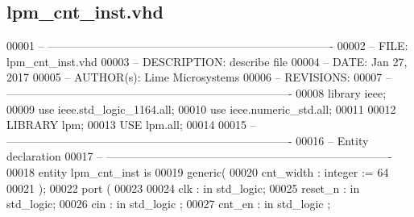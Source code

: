 \subsection{lpm\+\_\+cnt\+\_\+inst.\+vhd}
\label{src_2altera__inst_2lpm__cnt__inst_8vhd_source}

\begin{DoxyCode}
00001 \textcolor{keyword}{-- ---------------------------------------------------------------------------- }
00002 \textcolor{keyword}{-- FILE:    lpm\_cnt\_inst.vhd}
00003 \textcolor{keyword}{-- DESCRIPTION: describe file}
00004 \textcolor{keyword}{-- DATE:    Jan 27, 2017}
00005 \textcolor{keyword}{-- AUTHOR(s):   Lime Microsystems}
00006 \textcolor{keyword}{-- REVISIONS:}
00007 \textcolor{keyword}{-- ---------------------------------------------------------------------------- }
00008 \textcolor{vhdlkeyword}{library }\textcolor{keywordflow}{ieee};
00009 \textcolor{vhdlkeyword}{use }ieee.std\_logic\_1164.\textcolor{keywordflow}{all};
00010 \textcolor{vhdlkeyword}{use }ieee.numeric\_std.\textcolor{keywordflow}{all};
00011 
00012 \textcolor{vhdlkeyword}{LIBRARY }\textcolor{keywordflow}{lpm};
00013 \textcolor{vhdlkeyword}{USE }\textcolor{keywordflow}{lpm.all};
00014 
00015 \textcolor{keyword}{-- ----------------------------------------------------------------------------}
00016 \textcolor{keyword}{-- Entity declaration}
00017 \textcolor{keyword}{-- ----------------------------------------------------------------------------}
00018 \textcolor{keywordflow}{entity }lpm_cnt_inst \textcolor{keywordflow}{is}
00019    \textcolor{keywordflow}{generic}\textcolor{vhdlchar}{(}
00020       \textcolor{vhdlchar}{cnt_width}   \textcolor{vhdlchar}{:} \textcolor{comment}{integer} \textcolor{vhdlchar}{:=} \textcolor{vhdllogic}{}\textcolor{vhdllogic}{64}
00021    \textcolor{vhdlchar}{)};
00022    \textcolor{keywordflow}{port} \textcolor{vhdlchar}{(}
00023 
00024       \textcolor{vhdlchar}{clk}      \textcolor{vhdlchar}{:} \textcolor{keywordflow}{in} \textcolor{comment}{std\_logic};
00025       \textcolor{vhdlchar}{reset_n}  \textcolor{vhdlchar}{:} \textcolor{keywordflow}{in} \textcolor{comment}{std\_logic};
00026         \textcolor{vhdlchar}{cin}     \textcolor{vhdlchar}{:} \textcolor{keywordflow}{in} \textcolor{comment}{std\_logic} ;
00027         \textcolor{vhdlchar}{cnt_en}  \textcolor{vhdlchar}{:} \textcolor{keywordflow}{in} \textcolor{comment}{std\_logic} ;

\end{DoxyCode}
